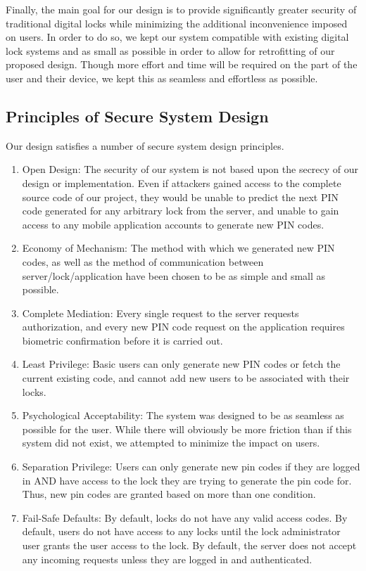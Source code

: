 \documentclass[conference]{IEEEtran}
\begin{document}
	Finally, the main goal for our design is to provide significantly greater security of traditional digital locks while minimizing the additional inconvenience imposed on users. In order to do so, we kept our system compatible with existing digital lock systems and as small as possible in order to allow for retrofitting of our proposed design. Though more effort and time will be required on the part of the user and their device, we kept this as seamless and effortless as possible. 


\subsection{Principles of Secure System Design}
Our design satisfies a number of secure system design principles.
\begin{enumerate}
\item{Open Design: The security of our system is not based upon the secrecy of our design or implementation. Even if attackers gained access to the complete source code of our project, they would be unable to predict the next PIN code generated for any arbitrary lock from the server, and unable to gain access to any mobile application accounts to generate new PIN codes.}
\item{
Economy of Mechanism: The method with which we generated new PIN codes, as well as the method of communication between server/lock/application have been chosen to be as simple and small as possible.
}
\item{
Complete Mediation: Every single request to the server requests authorization, and every new PIN code request on the application requires biometric confirmation before it is carried out.
}
\item{
Least Privilege: Basic users can only generate new PIN codes or fetch the current existing code, and cannot add new users to be associated with their locks.
}
\item{
Psychological Acceptability: The system was designed to be as seamless as possible for the user. While there will obviously be more friction than if this system did not exist, we attempted to minimize the impact on users.
}
\item{
Separation Privilege: Users can only generate new pin codes if they are logged in AND have access to the lock they are trying to generate the pin code for. Thus, new pin codes are granted based on more than one condition.
}
\item{
Fail-Safe Defaults: By default, locks do not have any valid access codes. By default, users do not have access to any locks until the lock administrator user grants the user access to the lock. By default, the server does not accept any incoming requests unless they are logged in and authenticated.
}
\end{enumerate}
\end{document}
